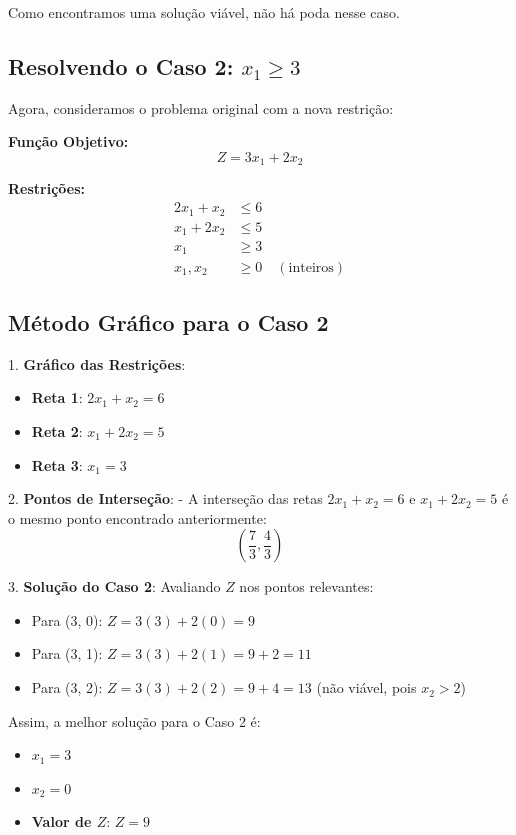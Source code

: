 \documentclass{article}
\begin{document}
Como encontramos uma solução viável, não há poda nesse caso.

\subsection{ Resolvendo o Caso 2: \(x_1 \geq 3\)}

Agora, consideramos o problema original com a nova restrição:

\textbf{Função Objetivo:}
\[
Z = 3x_1 + 2x_2
\]

\textbf{Restrições:}
\[
\begin{aligned}
2x_1 + x_2 &\leq 6 \\
x_1 + 2x_2 &\leq 5 \\
x_1 &\geq 3 \\
x_1, x_2 &\geq 0 \quad (\text{inteiros})
\end{aligned}
\]

\subsection{ Método Gráfico para o Caso 2}

1. \textbf{Gráfico das Restrições}:
   \begin{itemize}
       \item \textbf{Reta 1}: \(2x_1 + x_2 = 6\)
       \item \textbf{Reta 2}: \(x_1 + 2x_2 = 5\)
       \item \textbf{Reta 3}: \(x_1 = 3\)
   \end{itemize}

2. \textbf{Pontos de Interseção}:
   - A interseção das retas \(2x_1 + x_2 = 6\) e \(x_1 + 2x_2 = 5\) é o mesmo ponto encontrado anteriormente:
     \[
     \left(\frac{7}{3}, \frac{4}{3}\right)
     \]

3. \textbf{Solução do Caso 2}:
   Avaliando \(Z\) nos pontos relevantes:
   \begin{itemize}
       \item Para (3, 0): \(Z = 3(3) + 2(0) = 9\)
       \item Para (3, 1): \(Z = 3(3) + 2(1) = 9 + 2 = 11\)
       \item Para (3, 2): \(Z = 3(3) + 2(2) = 9 + 4 = 13\) (não viável, pois \(x_2 > 2\))
   \end{itemize}

Assim, a melhor solução para o Caso 2 é:
\begin{itemize}
    \item \(x_1 = 3\)
    \item \(x_2 = 0\)
    \item \textbf{Valor de \(Z\)}: \(Z = 9\)
\end{itemize}
\end{document}
